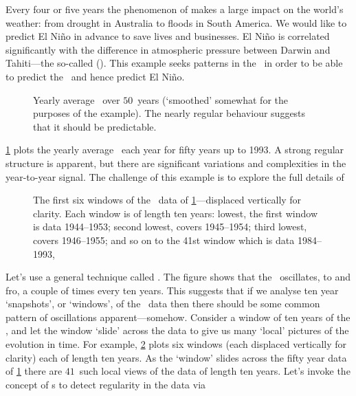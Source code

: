 \begin{example} \label{eg:orthbapp}
Every four or five years the phenomenon of  makes a large impact on the world's weather: from drought in Australia to floods in South America.
We would like to predict El Ni\~no in advance to save lives and businesses.
El Ni\~no is correlated significantly with the difference in atmospheric pressure between Darwin and Tahiti---the so-called  (\soi).
This example seeks patterns in the \soi\ in order to be able to predict the \soi\ and hence predict El Ni\~no.

\begin{figure}
\centering

\caption{Yearly average \soi\ over \(50\)~years (`smoothed' somewhat for the purposes of the example).  
The nearly regular behaviour suggests that it should be predictable.}
\label{fig:soiRoundData}
\end{figure}

\cref{fig:soiRoundData} plots the yearly average \soi\ each year for fifty years up to 1993.
A strong regular structure is apparent, but there are significant variations and complexities in the year-to-year signal.
The challenge of this example is to explore the full details of 

\begin{figure}
\centering

\caption{The first six windows of the \soi\ data of \cref{fig:soiRoundData}---displaced vertically for clarity. 
Each window is of length ten years: 
lowest, the first window is data 1944--1953;
second lowest, covers 1945--1954;
third lowest, covers 1946--1955; 
and so on to the 41st window which is data 1984--1993, }
\label{fig:soiRoundWind}
\end{figure}

Let's use a general technique called .
The figure shows that the \soi\ oscillates, to and fro, a couple of times every ten years.
This suggests that if we analyse ten year `snapshots', or `windows', of the \soi\ data then there should be some common pattern of oscillations apparent---somehow.
Consider a window of ten years of the \soi, and let the window `slide' across the data to give us many `local' pictures of the evolution in time.
For example, \cref{fig:soiRoundWind} plots six windows (each displaced vertically for clarity) each of length ten years.
As the `window' slides across the fifty year data of \cref{fig:soiRoundData} there are \(41\)~such local views of the data of length ten years.
Let's invoke the concept of s to detect regularity in the data via 


\end{example}
